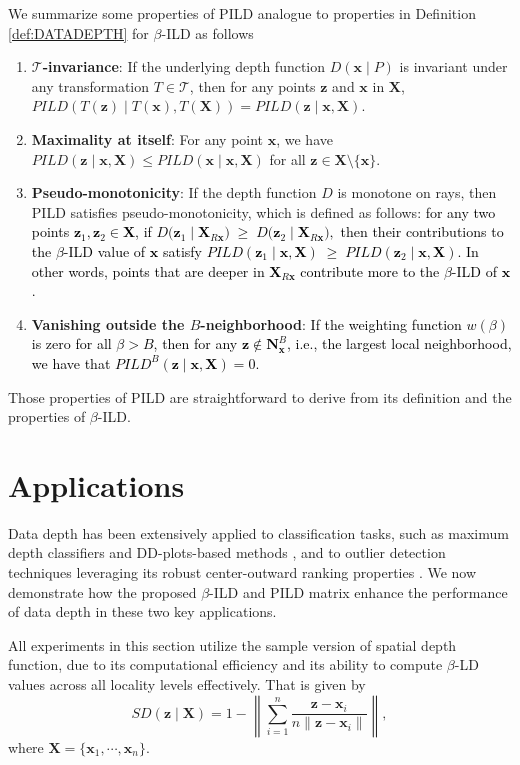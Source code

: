 \documentclass[final,3p,times]{elsarticle}
\newcommand{\vecx}{\mathbf{x}}
\newcommand{\vecX}{\mathbf{X}}
\newcommand{\vecN}{\mathbf{N}}
\newcommand{\vecz}{\mathbf{z}}
\begin{document}
We summarize some properties of PILD analogue to properties in Definition \ref{def:DATADEPTH} for $\beta$-ILD as follows
\begin{enumerate}[(Q1)]
    \item \textbf{$\mathcal{T}$-invariance}:  If the underlying depth function $D(\vecx\mid P)$ is invariant under any transformation $ T \in \mathcal{T} $, then for any points $ \vecz $ and $ \vecx $ in $ \vecX $,
    $
    PILD(T(\vecz) \mid T(\vecx), T(\vecX)) = PILD(\vecz \mid \vecx, \vecX).
    $
    \item \textbf{Maximality at itself}: For any point $ \vecx $, we have $ PILD(\vecz \mid \vecx, \vecX) \leq PILD(\vecx \mid \vecx, \vecX) $ for all $ \vecz \in \vecX \setminus \{\vecx\} $.
    \item  \textbf{Pseudo-monotonicity}: If the depth function $ D $ is monotone on rays, then PILD satisfies pseudo-monotonicity, which is defined as follows: \textcolor{black}{for any two points $\vecz_1,\vecz_2\in\vecX$, if
$
D\bigl(\vecz_1\mid \vecX_{R\vecx}\bigr)\;\ge\;D\bigl(\vecz_2\mid \vecX_{R\vecx}\bigr),
$
then their contributions to the $\beta$-ILD value of $\vecx$ satisfy
$PILD(\vecz_1\mid \vecx,\vecX)\;\ge\;PILD(\vecz_2\mid \vecx,\vecX).
$ In other words, points that are deeper in $\vecX_{R\vecx}$ contribute more to the $\beta$-ILD of $\vecx$.
}
    \item \textbf{Vanishing outside the $B$-neighborhood}: \textcolor{black}{If the weighting function $ w(\beta) $ is zero for all $ \beta > B $, then for any $\vecz\notin\vecN_\vecx^B$, i.e., the largest local neighborhood, we have that $ PILD^B(\vecz \mid \vecx, \vecX) = 0$.}
\end{enumerate}
Those properties of PILD are straightforward to derive from its definition and the properties of $\beta$-ILD.
\section{Applications}\label{sec:application}
Data depth has been extensively applied to classification tasks, such as maximum depth classifiers and DD-plots-based methods \cite{ghosh2005maximum, li2012dd, lange2014fast}, and to outlier detection techniques leveraging its robust center-outward ranking properties \cite{chen2008outlier, jeong2018outlier, mozharovskyi2022anomaly}. We now demonstrate how the proposed $\beta$-ILD and PILD matrix enhance the performance of data depth in these two key applications.

All experiments in this section utilize the sample version of spatial depth function, due to its computational efficiency and its ability to compute $\beta$-LD values across all locality levels effectively. That is given by
\begin{equation}\label{eq:SD}
SD(\vecz\mid \mathbf{X})=
1-\left\| \sum_{i=1}^n \frac{\vecz-\vecx_i}{n\| \vecz-\vecx_i \|} \right\|,
\end{equation}
where $\vecX=\{\vecx_1,\cdots,\vecx_n\}$.
\end{document}
